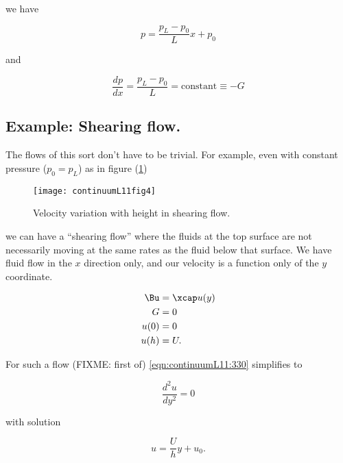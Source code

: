 we have

\begin{equation}\label{eqn:continuumL11:450}
p = \frac{p_L - p_0}{L} x + p_0
\end{equation}

and

\begin{equation}\label{eqn:continuumL11:470}
\frac{dp}{dx} = \frac{p_L - p_0}{L} = \text{constant} \equiv -G
\end{equation}

\subsection{Example: Shearing flow.}

The flows of this sort don't have to be trivial.  For example, even with constant pressure ($p_0 = p_L$) as in figure (\ref{fig:continuumL11:continuumL11fig4})

\begin{figure}[htp]
   \centering
   \texttt{[image: continuumL11fig4]}
   \caption{Velocity variation with height in shearing flow.}\label{fig:continuumL11:continuumL11fig4}
\end{figure}

we can have a ``shearing flow'' where the fluids at the top surface are not necessarily moving at the same rates as the fluid below that surface.  We have fluid flow in the $x$ direction only, and our velocity is a function only of the $y$ coordinate.

\begin{align}\label{eqn:continuumL11:490}
\Bu &= \xcap u(y) \\
G &= 0 \\
u(0) &= 0 \\
u(h) &= U.
\end{align}

For such a flow (FIXME: first of) \ref{eqn:continuumL11:330} simplifies to

\begin{equation}\label{eqn:continuumL11:530}
\frac{d^2 u}{dy^2} = 0
\end{equation}

with solution

\begin{equation}\label{eqn:continuumL11:550}
u = \frac{U}{h} y + u_0.
\end{equation}


